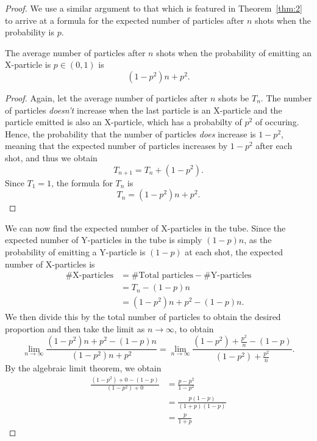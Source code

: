 \begin{proof}
  We use a similar argument to that which is featured in Theorem~\ref{thm:2} to arrive at a formula for the expected number of particles after $n$ shots when the probability is $p$.
  \begin{claim}
    The average number of particles after $n$ shots when the probability of emitting an X-particle is $p \in (0, 1)$ is \[
      (1-p^2)n + p^2
    .\] 
  \end{claim}
  \begin{proof}
    Again, let the average number of particles after $n$ shots be $T_n$. The number of particles \emph{doesn't} increase when the last particle is an X-particle and the particle emitted is also an X-particle, which has a probabilty of $p^2$ of occuring. Hence, the probability that the number of particles \emph{does} increase is $1-p^2$, meaning that the expected number of particles increases by $1-p^2$ after each shot, and thus we obtain \[
      T_{n+1} = T_{n} + (1-p^2)
    .\] Since $T_1 = 1$, the formula for $T_{n}$ is \[
      T_{n} = (1-p^2)n + p^2 \tag*{\qedhere}
    .\] 
  \end{proof}
  We can now find the expected number of X-particles in the tube. Since the expected number of Y-particles in the tube is simply $(1 - p)n$, as the probability of emitting a Y-particle is $(1-p)$ at each shot, the expected number of X-particles is 
  \begin{align*}
    \#\text{X-particles} &= \#\text{Total particles} - \#\text{Y-particles} \\
                         &= T_n - (1-p)n \\
                         &= (1-p^2)n + p^2 - (1-p)n.
  \end{align*}
  We then divide this by the total number of particles to obtain the desired proportion and then take the limit as $n \to \infty$, to obtain 
  \begin{equation*}
    \lim_{n \to \infty} \frac{(1-p^2)n + p^2 - (1-p)n}{(1-p^2)n + p^2} = \lim_{n \to \infty} \frac{(1-p^2) + \frac{p^2}{n} - (1-p)}{(1-p^2) + \frac{p^2}{n}}.
  \end{equation*}
  By the algebraic limit theorem, we obtain 
  \begin{align*}
    \frac{(1-p^2) + 0 - (1-p)}{(1-p^2) + 0} &= \frac{p - p^2}{1 - p^2} \\
                                                                &= \frac{p(1 - p)}{(1+p)(1-p)} \\
                                                                &= \frac{p}{1+p} \tag*{\qedhere}
  \end{align*}
\end{proof}
